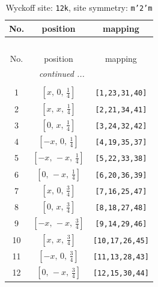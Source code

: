 \documentclass[fleqn,8pt]{jsarticle}
\begin{document}
\begin{longtable}{ccc}
\caption{Wyckoff site: {\tt 12k}, site symmetry: {\tt m'2'm}}
 \\
 \hline \hline
No. & position & mapping \\ \hline \endfirsthead

\multicolumn{2}{l}{\tablename\ \thetable{}} \\
 \hline \hline
No. & position & mapping \\ \hline \endhead

 \hline \hline
\multicolumn{2}{r}{\footnotesize\it continued ...} \\ \endfoot

 \hline \hline
\multicolumn{2}{r}{} \\ \endlastfoot

1 & $\left[ x,\, 0,\, \frac{1}{4} \right]$ & {\tt [1,23,31,40]} \\ \hline
2 & $\left[ x,\, x,\, \frac{1}{4} \right]$ & {\tt [2,21,34,41]} \\ \hline
3 & $\left[ 0,\, x,\, \frac{1}{4} \right]$ & {\tt [3,24,32,42]} \\ \hline
4 & $\left[ - x,\, 0,\, \frac{1}{4} \right]$ & {\tt [4,19,35,37]} \\ \hline
5 & $\left[ - x,\, - x,\, \frac{1}{4} \right]$ & {\tt [5,22,33,38]} \\ \hline
6 & $\left[ 0,\, - x,\, \frac{1}{4} \right]$ & {\tt [6,20,36,39]} \\ \hline
7 & $\left[ x,\, 0,\, \frac{3}{4} \right]$ & {\tt [7,16,25,47]} \\ \hline
8 & $\left[ 0,\, x,\, \frac{3}{4} \right]$ & {\tt [8,18,27,48]} \\ \hline
9 & $\left[ - x,\, - x,\, \frac{3}{4} \right]$ & {\tt [9,14,29,46]} \\ \hline
10 & $\left[ x,\, x,\, \frac{3}{4} \right]$ & {\tt [10,17,26,45]} \\ \hline
11 & $\left[ - x,\, 0,\, \frac{3}{4} \right]$ & {\tt [11,13,28,43]} \\ \hline
12 & $\left[ 0,\, - x,\, \frac{3}{4} \right]$ & {\tt [12,15,30,44]} \\
\end{longtable}
\renewcommand{\arraystretch}{1.2}
\end{document}

